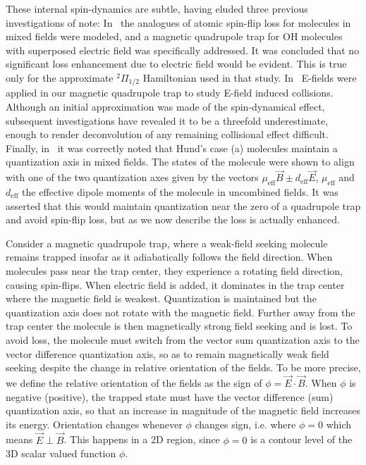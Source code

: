 \documentclass[%
 reprint,
 amsmath,amssymb,
 aps,
prl,
]{revtex4-1}
\newcommand{\epb}{{$\vec{E}\!\perp\!\vec{B}$}}
\begin{document}
These internal spin-dynamics are subtle, having eluded three previous investigations of note: In~\cite{Lara2008} the analogues of atomic spin-flip loss for molecules in mixed fields were modeled, and a magnetic quadrupole trap for OH molecules with superposed electric field was specifically addressed. 
It was concluded that no significant loss enhancement due to electric field would be evident. 
This is true only for the approximate $^2\Pi_{1/2}$ Hamiltonian used in that study. 
In~\cite{Stuhl2013} E-fields were applied in our magnetic quadrupole trap to study E-field induced collisions. 
Although an initial approximation was made of the spin-dynamical effect, subsequent investigations have revealed it to be a threefold underestimate, enough to render deconvolution of any remaining collisional effect difficult. 
Finally, in~\cite{Bohn2013} it was correctly noted that Hund's case (a) molecules maintain a quantization axis in mixed fields. 
The states of the molecule were shown to align with one of the two quantization axes given by the vectors $\mu_\text{eff}\vec{B}\pm d_\text{eff}\vec{E}$, $\mu_\text{eff}$ and $d_\text{eff}$ the effective dipole moments of the molecule in uncombined fields. 
It was asserted that this would maintain quantization near the zero of a quadrupole trap and avoid spin-flip loss, but as we now describe the loss is actually enhanced.



Consider a magnetic quadrupole trap, where a weak-field seeking molecule remains trapped insofar as it adiabatically follows the field direction. 
When molecules pass near the trap center, they experience a rotating field direction, causing spin-flips. 
When electric field is added, it dominates in the trap center where the magnetic field is weakest. 
Quantization is maintained but the quantization axis does not rotate with the magnetic field. 
Further away from the trap center the molecule is then magnetically strong field seeking and is lost. 
To avoid loss, the molecule must switch from the vector sum quantization axis to the vector difference quantization axis, so as to remain magnetically weak field seeking despite the change in relative orientation of the fields. 
To be more precise, we define the relative orientation of the fields as the sign of $\phi=\vec{E}\cdot\vec{B}$. 
When $\phi$ is negative (positive), the trapped state must have the vector difference (sum) quantization axis, so that an increase in magnitude of the magnetic field increases its energy. 
Orientation changes whenever $\phi$ changes sign, i.e. where $\phi=0$ which means \epb. 
This happens in a 2D region, since $\phi=0$ is a contour level of the 3D scalar valued function $\phi$. 
\end{document}

